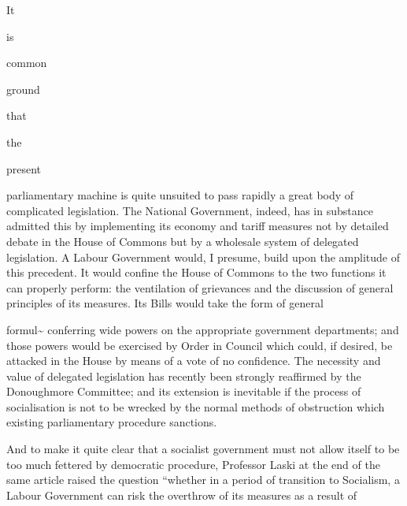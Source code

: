 \documentclass[11pt,openany]{book}
\begin{document}
It

is

common

ground

that

the

present

parliamentary machine is quite unsuited to pass rapidly a great body of complicated legislation. The National Government, indeed, has in substance admitted this by implementing its economy and tariff measures not by detailed debate in the House of Commons but by a wholesale system of delegated legislation. A Labour Government would, I presume, build upon the amplitude of this precedent. It would confine the House of Commons to the two functions it can properly perform: the ventilation of grievances and the discussion of general principles of its measures. Its Bills would take the form of general

formul\textasciitilde{} conferring wide powers on the appropriate government departments; and those powers would be exercised by Order in Council which could, if desired, be attacked in the House by means of a vote of no confidence. The necessity and value of delegated legislation has recently been strongly reaffirmed by the Donoughmore Committee; and its extension is inevitable if the process of socialisation is not to be wrecked by the normal methods of obstruction which existing parliamentary procedure sanctions.

And to make it quite clear that a socialist government must not allow itself to be too much fettered by democratic procedure, Professor Laski at the end of the same article raised the question ``whether in a period of transition to Socialism, a Labour Government can risk the overthrow of its measures as a result of

\begin{center}\textasteriskcentered\hspace{0.9em}\textasteriskcentered\hspace{0.9em}\textasteriskcentered\end{center}

\begin{center}\textasteriskcentered\hspace{0.9em}\textasteriskcentered\hspace{0.9em}\textasteriskcentered\end{center}

\begin{center}\textasteriskcentered\hspace{0.9em}\textasteriskcentered\hspace{0.9em}\textasteriskcentered\end{center}
\end{document}
